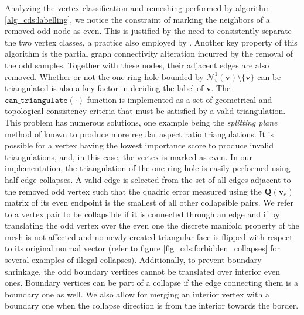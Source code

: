 \documentclass[graybox]{svmult}
\begin{document}
	Analyzing the vertex classification and remeshing performed by algorithm \ref{alg_cds:labelling}, we notice the constraint of marking the neighbors of a removed odd node as even. This is justified by the need to consistently separate the two vertex classes,  a practice also employed by \cite{Guskov1999}. Another key property of this algorithm is the partial graph connectivity alteration incurred by the removal of the odd samples. Together with these nodes, their adjacent edges are also removed. Whether or not the one-ring hole bounded by $\mathcal{N}_v^1(\mathbf{v})\setminus\{\mathbf{v}\}$ can be triangulated is also a key factor in deciding the label of $\mathbf{v}$. The $\mathtt{can\_triangulate}(\cdot)$ function is implemented as a set of geometrical and topological consistency criteria that must be satisfied by a valid triangulation. This problem has numerous solutions, one example being the \emph{splitting plane} method of \cite{Schroeder1992} known to produce more regular aspect ratio triangulations. It is possible for a vertex having the lowest importance score to produce invalid triangulations, and, in this case, the vertex is marked as even. In our implementation, the triangulation of the one-ring hole is easily performed using half-edge collapses. A valid edge is selected from the set of all edges adjacent to the removed odd vertex such that the quadric error measured using the $\mathbf{Q}(\mathbf{v}_e)$ matrix of its even endpoint is the smallest of all other collapsible pairs. We refer to a vertex pair to be collapsible if it is connected through an edge and if by translating the odd vertex over the even one the discrete manifold property of the mesh is not affected and no newly created triangular face is flipped with respect to its original normal vector (refer to figure \ref{fig_cds:forbidden_collapses} for several examples of illegal collapses). Additionally, to prevent boundary shrinkage, the odd boundary vertices cannot be translated over interior even ones. Boundary vertices can be part of a collapse if the edge connecting them is a boundary one as well. We also allow for merging an interior vertex with a boundary one when the collapse direction is from the interior towards the border.
	
	
	
\end{document}
